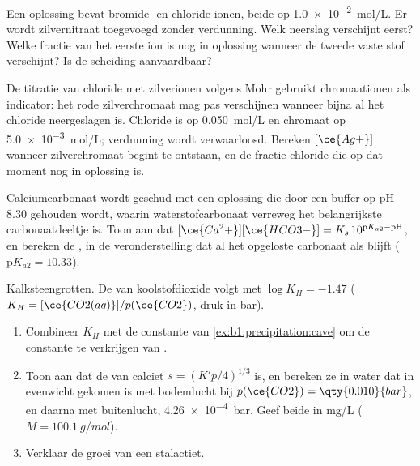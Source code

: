 \begin{exercise}[$\star\star$]\label{exo:b1:precipitation:7}
Een oplossing bevat bromide- en chloride-ionen, beide op
\qty{1.0e-2}{mol/L}. Er wordt zilvernitraat toegevoegd zonder
verdunning. Welk neerslag verschijnt eerst? Welke fractie van het eerste
ion is nog in oplossing wanneer de tweede vaste stof verschijnt? Is de
scheiding aanvaardbaar?
\end{exercise}

\begin{exercise}[$\star\star$]\label{exo:b1:precipitation:8}
De titratie van chloride met zilverionen volgens Mohr gebruikt
chromaationen als indicator: het rode zilverchromaat mag pas verschijnen
wanneer bijna al het chloride neergeslagen is. Chloride is op
\qty{0.050}{mol/L} en chromaat op \qty{5.0e-3}{mol/L}; verdunning wordt
verwaarloosd. Bereken $[\ce{Ag+}]$ wanneer zilverchromaat begint te
ontstaan, en de fractie chloride die op dat moment nog in oplossing is.
\end{exercise}

\begin{exercise}[$\star\star$]\label{exo:b1:precipitation:9}
Calciumcarbonaat wordt geschud met een oplossing die door een buffer op
pH 8.30 gehouden wordt, waarin waterstofcarbonaat verreweg het
belangrijkste carbonaatdeeltje is. Toon aan dat
$[\ce{Ca^2+}][\ce{HCO3-}] = K_s\,10^{\mathrm{p}K_{a2} - \mathrm{pH}}$, en
bereken de , in de veronderstelling dat al het opgeloste
carbonaat als  blijft ($\mathrm{p}K_{a2} = 10.33$).
\end{exercise}

\begin{exercise}[$\star\star\star$]\label{exo:b1:precipitation:10}
Kalksteengrotten. De  van koolstofdioxide volgt
 met $\log K_H = -1.47$ ($K_H =
[\ce{CO2(aq)}]/p(\ce{CO2})$, druk in bar).
\begin{enumerate}
  \item Combineer $K_H$ met de constante van
        \cref{ex:b1:precipitation:cave} om de constante te verkrijgen van
        .
  \item Toon aan dat de  van calciet $s = (K'p/4)^{1/3}$ is,
        en bereken ze in water dat in evenwicht gekomen is met bodemlucht
        bij $p(\ce{CO2}) = \qty{0.010}{bar}$, en daarna met buitenlucht,
        \qty{4.26e-4}{bar}. Geef beide in \unit{mg/L} 
        ($M = \qty{100.1}{g/mol}$).
  \item Verklaar de groei van een stalactiet.
\end{enumerate}
\end{exercise}

